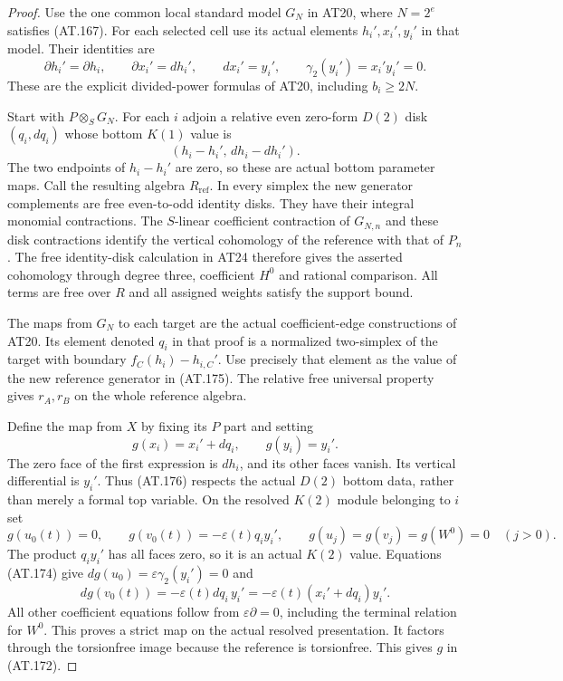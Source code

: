 \begin{proof}
Use the one common local standard model $G_N$
in AT20, where $N=2^e$ satisfies (AT.167).
For each selected cell use its actual elements
$h_i',x_i',y_i'$ in that model. Their identities are
\[
 \partial h_i'=\partial h_i,\qquad
 \partial x_i'=dh_i',\qquad dx_i'=y_i',
 \qquad \gamma_2(y_i')=x_i'y_i'=0.
 \tag{AT.174}
\]
These are the explicit divided-power formulas
of AT20, including $b_i\geq2N$.

Start with $P\otimes_S G_N$.
For each $i$ adjoin a relative even zero-form
$D(2)$ disk $(q_i,dq_i)$ whose bottom $K(1)$
value is
\[
                      (h_i-h_i',\,dh_i-dh_i').
 \tag{AT.175}
\]
The two endpoints of $h_i-h_i'$ are zero, so
these are actual bottom parameter maps.
Call the resulting algebra $R_{\mathrm{ref}}$.
In every simplex the new generator complements
are free even-to-odd identity disks.
They have their integral monomial contractions.
The $S$-linear coefficient contraction of $G_{N,n}$
and these disk contractions identify the vertical
cohomology of the reference with that of $P_n$.
The free identity-disk calculation in AT24
therefore gives the asserted cohomology through
degree three, coefficient $H^0$ and rational
comparison. All terms are free over $R$ and
all assigned weights satisfy the support bound.

The maps from $G_N$ to each target are the actual
coefficient-edge constructions of AT20.
Its element denoted $q_i$ in that proof is a
normalized two-simplex of the target with
boundary $f_C(h_i)-h_{i,C}'$.
Use precisely that element as the value of the
new reference generator in (AT.175).
The relative free universal property gives
$r_A,r_B$ on the whole reference algebra.

Define the map from $X$ by fixing its $P$ part
and setting
\[
             g(x_i)=x_i'+dq_i,\qquad
             g(y_i)=y_i'.
 \tag{AT.176}
\]
The zero face of the first expression is $dh_i$,
and its other faces vanish.
Its vertical differential is $y_i'$.
Thus (AT.176) respects the actual $D(2)$ bottom
data, rather than merely a formal top variable.
On the resolved $K(2)$ module belonging to $i$
set
\[
 g(u_0(t))=0,\qquad
 g(v_0(t))=-\varepsilon(t)q_i y_i',
 \qquad g(u_j)=g(v_j)=g(W^0)=0\quad(j>0).
 \tag{AT.177}
\]
The product $q_i y_i'$ has all faces zero, so
it is an actual $K(2)$ value.
Equations (AT.174) give
$d g(u_0)=\varepsilon\gamma_2(y_i')=0$ and
\[
 d g(v_0(t))=-\varepsilon(t)dq_i\,y_i'
       =-\varepsilon(t)(x_i'+dq_i)y_i'.
 \]
All other coefficient equations follow from
$\varepsilon\partial=0$, including the terminal
relation for $W^0$. This proves a strict map
on the actual resolved presentation.
It factors through the torsionfree image because
the reference is torsionfree.
This gives $g$ in (AT.172).


\end{proof}
